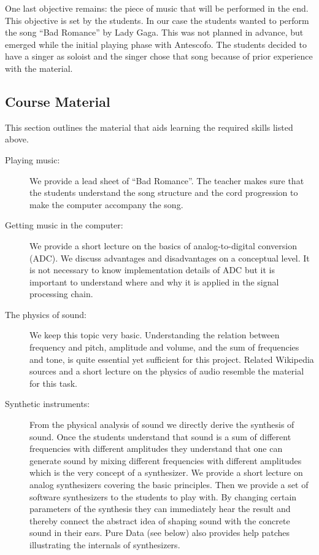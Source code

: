\documentclass[onecolumn,nocopyrightspace,preprint]{sigplanconf}
\begin{document}
One last objective remains: the piece of music that will be performed in the
end. This objective is set by the students. In our case the students wanted to
perform the song ``Bad Romance'' by Lady Gaga. This was not planned in
advance, but emerged while the initial playing phase with Antescofo. The
students decided to have a singer as soloist and the singer chose that song
because of prior experience with the material.


\subsection{Course Material}\label{sec:material}


This section outlines the material that aids learning the required skills
listed above.

\begin{description}

\item[Playing music:] We provide a lead sheet of ``Bad Romance''. The teacher
makes sure that the students understand the song structure and the cord progression
to make the computer accompany the song. 

\item[Getting music in the computer:] We provide a short lecture on the basics
of analog-to-digital conversion (ADC). We discuss advantages and disadvantages
on a conceptual level. It is not necessary to know implementation details
of ADC but it is important to understand where and why it is applied in the
signal processing chain.

\item[The physics of sound:] We keep this topic very basic. Understanding the
relation between frequency and pitch, amplitude and volume, and the sum of
frequencies and tone, is quite essential yet sufficient for this project.
Related Wikipedia sources and a short lecture on the physics of audio resemble
the material for this task.

\item[Synthetic instruments:] From the physical analysis of sound we directly
derive the synthesis of sound. Once the students understand that sound is a
sum of different frequencies  with different amplitudes they understand that
one can generate sound by mixing different frequencies with different
amplitudes which is the very concept of a synthesizer. We provide a short
lecture on analog synthesizers covering the basic principles. Then we
provide a set of software synthesizers to the students to play with. By
changing certain parameters of the synthesis they can immediately hear the
result and thereby connect the abstract idea of shaping sound with the
concrete sound in their ears. Pure Data (see below) also provides help patches
illustrating the internals of synthesizers.


\end{description}
\end{document}
